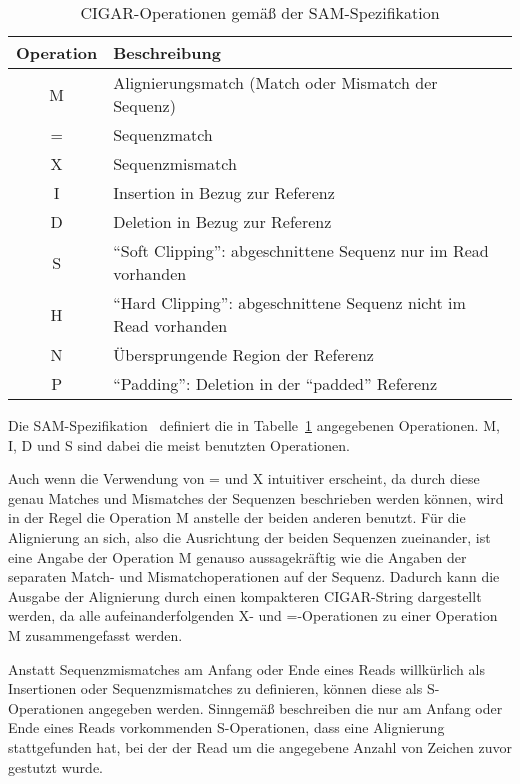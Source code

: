 \begin{table}[ht]
    \begin{center}
    \begin{tabular}{c|l}
        Operation & Beschreibung \\
        \hline
        M & Alignierungsmatch (Match oder Mismatch der Sequenz)\\
        = & Sequenzmatch\\
        X & Sequenzmismatch\\
        I & Insertion in Bezug zur Referenz\\
        D & Deletion in Bezug zur Referenz\\
        S & "`Soft Clipping"': abgeschnittene Sequenz nur im Read vorhanden\\
        H & "`Hard Clipping"': abgeschnittene Sequenz nicht im Read vorhanden\\
        N & Übersprungende Region der Referenz\\
        P & "`Padding"': Deletion in der "`padded"' Referenz\\
    \end{tabular}
    \end{center}
    \caption{CIGAR-Operationen gemäß der SAM-Spezifikation}
    \label{tab:data:cigar}
\end{table}
Die SAM-Spezifikation~\citep{samspec} definiert die in Tabelle~\ref{tab:data:cigar} angegebenen Operationen.
M, I, D und S sind dabei die meist benutzten Operationen.

Auch wenn die Verwendung von = und X intuitiver erscheint, da durch diese genau Matches und Mismatches der Sequenzen beschrieben werden können, wird in der Regel die Operation M anstelle der beiden anderen benutzt.
Für die Alignierung an sich, also die Ausrichtung der beiden Sequenzen zueinander, ist eine Angabe der Operation M genauso aussagekräftig wie die Angaben der separaten Match- und Mismatchoperationen auf der Sequenz.
Dadurch kann die Ausgabe der Alignierung durch einen kompakteren CIGAR-String dargestellt werden, da alle aufeinanderfolgenden X- und =-Operationen zu einer Operation M zusammengefasst werden.

Anstatt Sequenzmismatches am Anfang oder Ende eines Reads willkürlich als Insertionen oder Sequenzmismatches zu definieren, können diese als S-Operationen angegeben werden.
Sinngemäß beschreiben die nur am Anfang oder Ende eines Reads vorkommenden S-Operationen, dass eine Alignierung stattgefunden hat, bei der der Read um die angegebene Anzahl von Zeichen zuvor gestutzt wurde.

